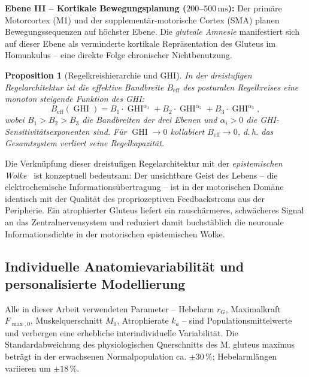﻿\documentclass[12pt,a4paper]{report}
\theoremstyle{plain}
\newtheorem{proposition}[theorem]{Proposition}
\theoremstyle{definition}
\theoremstyle{remark}
\DeclareMathOperator{\GHI}{GHI}
\begin{document}
	\textbf{Ebene III -- Kortikale Bewegungsplanung ($200$--$500\,\mathrm{ms}$):}
	Der primäre Motorcortex (M1) und der supplementär-motorische Cortex (SMA)
	planen Bewegungssequenzen auf höchster Ebene. Die \emph{gluteale Amnesie}
	manifestiert sich auf dieser Ebene als verminderte kortikale Repräsentation
	des Gluteus im Homunkulus -- eine direkte Folge chronischer Nichtbenutzung.
	
	\begin{proposition}[Regelkreishierarchie und GHI]
		\label{prop:regelkreis}
		In der dreistufigen Regelarchitektur ist die effektive Bandbreite
		$B_\mathrm{eff}$ des posturalen Regelkreises eine monoton steigende
		Funktion des GHI:
		\[
		B_\mathrm{eff}(\GHI) = B_1 \cdot \GHI^{\alpha_1}
		+ B_2 \cdot \GHI^{\alpha_2} + B_3 \cdot \GHI^{\alpha_3},
		\]
		wobei $B_1 > B_2 > B_3$ die Bandbreiten der drei Ebenen und
		$\alpha_i > 0$ die GHI-Sensitivitäts\-exponenten sind. Für
		$\GHI \to 0$ kollabiert $B_\mathrm{eff} \to 0$, d.\,h. das
		Gesamtsystem verliert seine Regelkapazität.
	\end{proposition}
	
	Die Verknüpfung dieser dreistufigen Regelarchitektur mit der
	\emph{epistemischen Wolke}~\cite{epp2026wolke} ist konzeptuell bedeutsam:
	Der unsichtbare Geist des Lebens -- die elektrochemische
	Informationsübertragung -- ist in der motorischen Domäne identisch mit
	der Qualität des propriozeptiven Feedbackstroms aus der Peripherie.
	Ein atrophierter Gluteus liefert ein rauschärmeres, schwächeres
	Signal an das Zentralnervensystem und reduziert damit buchstäblich
	die neuronale Informationsdichte in der motorischen epistemischen Wolke.
	
	\subsection{Individuelle Anatomievariabilität und personalisierte Modellierung}
	\label{subsec:variabilitaet}
	
	Alle in dieser Arbeit verwendeten Parameter -- Hebelarm $r_G$,
	Maximalkraft $F_{\max,0}$, Muskelquerschnitt $M_0$, Atrophierate $k_a$ --
	sind Populationsmittelwerte und verbergen eine erhebliche interindividuelle
	Variabilität. Die Standardabweichung des physiologischen Querschnitts
	des M. gluteus maximus beträgt in der erwachsenen Normalpopulation
	ca. $\pm 30\,\%$; Hebelarmlängen variieren um $\pm 18\,\%$.
	
\end{document}
